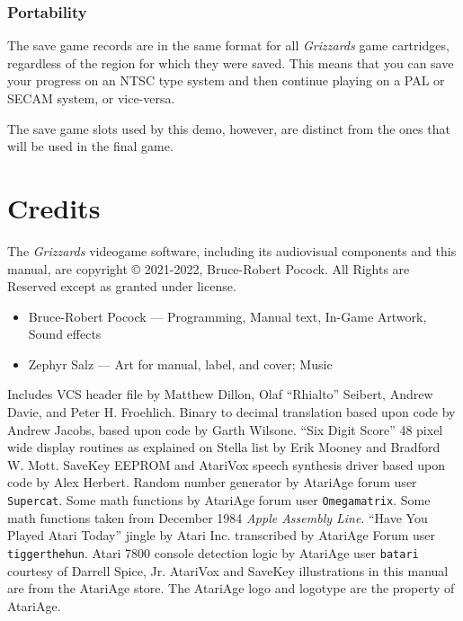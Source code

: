 \documentclass[10pt,twocolumn,openany,article]{memoir}
\begin{document}
\begin{description}
\fi


\subsection{Portability}

The save game records are in the same format for all \textit{Grizzards} game
cartridges, regardless of the region for which they were saved.  This means
that you can save your progress on an NTSC type system and then continue
playing on a PAL or SECAM system, or vice-versa.

\ifdefined\DEMO

The save  game slots used by  this demo, however, are  distinct from the
ones that will be used in the final game.

\fi

\fi %

\chapter{Credits}

{\small

  The \textit{Grizzards}  videogame software, including  its audiovisual
  components  and this  manual,  are  copyright \copyright{}  2021-2022,
  Bruce-Robert  Pocock.  All  Rights  are  Reserved  except  as  granted
  under license.

\begin{itemize}
\item Bruce-Robert Pocock --- Programming, Manual text, In-Game Artwork,
  Sound effects
\item Zephyr Salz --- Art for manual, label, and cover; Music
\end{itemize}

\bigskip


Includes VCS  header file by  Matthew Dillon, Olaf  ``Rhialto'' Seibert,
Andrew  Davie, and  Peter H.  Froehlich. Binary  to decimal  translation
based upon  code by  Andrew Jacobs,  based upon  code by  Garth Wilsone.
``Six  Digit Score''  48 pixel  wide  display routines  as explained  on
Stella list  by Erik  Mooney and  Bradford W.  Mott. SaveKey  EEPROM and
AtariVox  speech  synthesis driver  based  upon  code by  Alex  Herbert.
Random  number  generator  by  AtariAge  forum  user  \texttt{Supercat}.
Some  math  functions  by AtariAge  forum  user  \texttt{Omega\-matrix}.
Some  math functions  taken  from December  1984 \textit{Apple  Assembly
  Line}.  ``Have  You   Played  Atari  Today''  jingle   by  Atari  Inc.
transcribed by AtariAge Forum user \texttt{tigger\-the\-hun}. Atari 7800
console  detection logic  by AtariAge  user \texttt{batari}  courtesy of
Darrell Spice, Jr. AtariVox and SaveKey illustrations in this manual are
from  the AtariAge  store.  \ifdefined\DEMO\else The  AtariAge logo  and
logotype are the property of AtariAge. \fi

}
\end{description}
\end{document}

